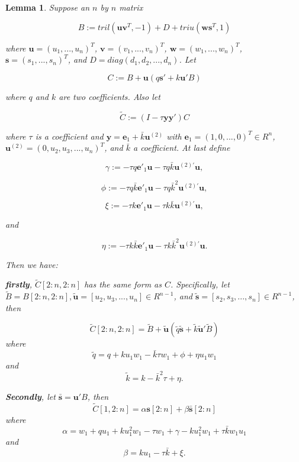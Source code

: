 \documentclass{article}
\newtheorem{lemma}{Lemma}
\begin{document}
\begin{lemma} \label{helpful_lemma}
Suppose an $n$ by $n$ matrix 

$$B:=tril(\mathbf{u}\mathbf{v}^T, -1) + D + triu(\mathbf{w}\mathbf{s}^T, 1)$$

where $\mathbf{u}=(u_1,...,u_n)^T$, $\mathbf{v}=(v_1,...,v_n)^T$, $\mathbf{w}=(w_1,...,w_n)^T$, $\mathbf{s}=(s_1,...,s_n)^T$, and $D=diag(d_1, d_2, ..., d_n)$. Let 

$$C:=B+\mathbf{u}(q\mathbf{s}'+k\mathbf{u}'B)$$ 

where $q$ and $k$ are two coefficients. Also let 

$$\tilde{C}:=(I-\tau\mathbf{y}\mathbf{y}')C$$

where $\tau$ is a coefficient and $\mathbf{y}=\mathbf{e}_1+\bar{k}\mathbf{u}^{(2)}$ with $\mathbf{e}_1=(1,0,...,0)^T\in R^n$, $\mathbf{u}^{(2)}=(0,u_2,u_3,...,u_n)^T$, and $\bar{k}$ a coefficient. At last define 

$$\gamma:=-\tau q\mathbf{e'}_1\mathbf{u}-\tau q\bar{k}\mathbf{u}^{(2)'}\mathbf{u},$$

$$\phi:=-\tau q\bar{k}\mathbf{e'}_1\mathbf{u}-\tau q\bar{k}^2\mathbf{u}^{(2)'}\mathbf{u},$$

$$\xi:=-\tau k\mathbf{e'}_1\mathbf{u}-\tau k\bar{k}\mathbf{u}^{(2)'}\mathbf{u},$$

and 

$$\eta:=-\tau k\bar{k}\mathbf{e'}_1\mathbf{u}-\tau k \bar{k}^2\mathbf{u}^{(2)'}\mathbf{u}.$$

Then we have:

\textbf{firstly}, $\tilde{C}[2:n,2:n]$ has the same form as $C$. Specifically, let $\tilde{B}=B[2:n,2:n], \tilde{\mathbf{u}}=[u_2,u_3,...,u_n]\in R^{n-1}$, and $\tilde{\mathbf{s}}=[s_2,s_3,...,s_n]\in R^{n-1}$, then

\begin{equation}
    \tilde{C}[2:n,2:n]=\tilde{B}+\tilde{\mathbf{u}}(\tilde{q}\tilde{\mathbf{s}}+\tilde{k}\tilde{\mathbf{u}}'\tilde{B})
\end{equation}
where
\begin{equation}
 \tilde{q}=q+ku_1w_1-\bar{k}\tau w_1+\phi+\eta u_1w_1
\end{equation}
and
\begin{equation}
    \tilde{k}=k-\bar{k}^2\tau+\eta.
\end{equation}

\textbf{Secondly}, let $\bar{\mathbf{s}}=\mathbf{u}'B$, then
\begin{equation}
    \tilde{C}[1,2:n]=\alpha \mathbf{s}[2:n]+\beta\bar{\mathbf{s}}[2:n]
\end{equation}
where
\begin{equation}
    \alpha=w_1+qu_1+ku_1^2w_1-\tau w_1+\gamma - ku_1^2w_1+\tau \bar{k}w_1u_1
\end{equation}
and
\begin{equation}
    \beta=ku_1-\tau \bar{k}+\xi.
\end{equation}

\end{lemma}
\end{document}
